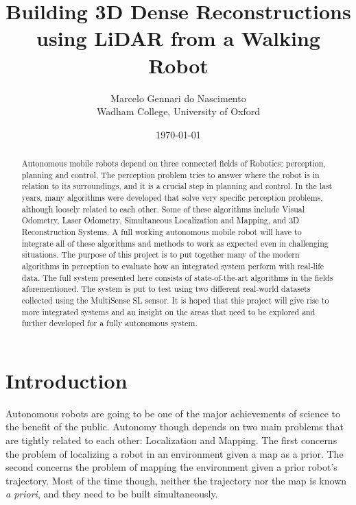 \documentclass[12pt]{article}
\title{Building 3D Dense Reconstructions using LiDAR from a Walking Robot}
\author{Marcelo Gennari do Nascimento \\ Wadham College, University of Oxford}
\date{\today}
\begin{document}

	\maketitle

	\newpage

	\begin{abstract}
		Autonomous mobile robots depend on three connected fields of Robotics: perception, planning and control. The perception problem tries to answer where the robot is in relation to its surroundings, and it is a crucial step in planning and control.
		In the last years, many algorithms were developed that solve very specific perception problems, although loosely related to each other. Some of these algorithms include Visual Odometry, Laser Odometry, Simultaneous Localization and Mapping, and 3D Reconstruction Systems.
		A full working autonomous mobile robot will have to integrate all of these algorithms and methods to work as expected even in challenging situations.
		The purpose of this project is to put together many of the modern algorithms in perception to evaluate how an integrated system perform with real-life data. The full system presented here consists of state-of-the-art algorithms in the fields aforementioned. The system is put to test using two different real-world datasets collected using the MultiSense SL sensor.
		It is hoped that this project will give rise to more integrated systems and an insight on the areas that need to be explored and further developed for a fully autonomous system.
	\end{abstract}

	\newpage
	\tableofcontents

	\newpage

	\section{Introduction}

Autonomous robots are going to be one of the major achievements of science to the benefit of the public. Autonomy though depends on two main problems that are tightly related to each other: Localization and Mapping. The first concerns the problem of localizing a robot in an environment given a map as a prior. The second concerns the problem of mapping the environment given a prior robot's trajectory. Most of the time though, neither the trajectory nor the map is known \textit{a priori}, and they need to be built simultaneously.
	
\end{document}
